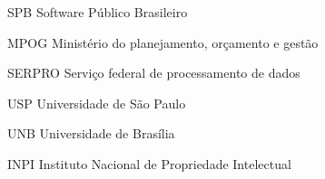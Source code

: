 \begin{siglas}
  \item[SPB] Software Público Brasileiro
  \item[MPOG] Ministério do planejamento, orçamento e gestão
  \item[SERPRO] Serviço federal de processamento de dados
  \item[USP] Universidade de São Paulo
  \item[UNB] Universidade de Brasília
  \item[INPI] Instituto Nacional de Propriedade Intelectual 
\end{siglas}

